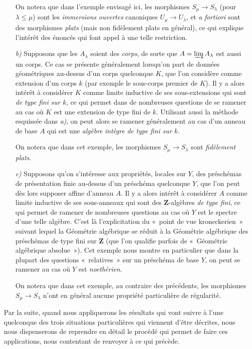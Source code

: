 \begin{env}[8.1.2]
\begin{enumerate}
On notera que dans l'exemple envisagé ici, les morphismes
$S_\mu\to S_\lambda$ (pour $\lambda\leq\mu$) sont les \emph{immersions
ouvertes} canoniques $U_\mu\to U_\lambda$, et \emph{a fortiori} sont des
morphismes \emph{plats} (mais non fidèlement plats en général), ce qui
explique l'intérêt des énoncés qui font appel à une telle restriction.

\item[\emph{b)}] Supposons que les $A_\lambda$ soient des \emph{corps}, de
sorte que $A=\varinjlim A_\lambda$ est aussi un corps. Ce cas se présente
généralement lorsqu'on part de données géométriques au-dessus d'un corps
quelconque $K$, que l'on considère comme extension d'un corps $k$ (par exemple
le sous-corps premier de $K$). Il y a alors intérêt à considérer $K$ comme
limite inductive de ses sous-extensions qui sont \emph{de type fini sur $k$},
ce qui permet dans de nombreuses questions de se ramener au cas où $K$ est
une extension de type fini de $k$. Utilisant aussi la méthode esquissée dans
\emph{a)}, on peut alors se ramener généralement au cas d'un anneau de base
$A$ qui est une \emph{algèbre intègre de type fini sur $k$}.

On notera que dans cet exemple, les morphismes $S_\mu\to S_\lambda$ sont
\emph{fidèlement plats}.

\item[\emph{c)}] Supposons qu'on s'intéresse aux propriétés, locales sur
$Y$, des préschémas de présentation finie au-dessus d'un préschéma quelconque
$Y$, que l'on peut dès lors supposer affine d'anneau $A$. Il y a alors intérêt
à considérer $A$ comme limite inductive de ses sous-anneaux qui sont des
$\mathbf Z$-algèbres \emph{de type fini}, ce qui permet de ramener de
nombreuses questions au cas où $Y$ est le spectre d'une telle algèbre. C'est
là l'explicitation du «~point de vue kroneckerien~» suivant lequel la
Géométrie algébrique se réduit à la Géométrie algébrique des préschémas de
type fini sur $\mathbf Z$ (que l'on qualifie parfois de
«~Géométrie algébrique absolue~»). Cet exemple nous montre en particulier que
dans la plupart des questions «~relatives~» sur un préschéma de base $Y$, on
peut se ramener au cas où $Y$ est \emph{noethérien}.

On notera que dans cet exemple, au contraire des précédents, les morphismes
$S_\mu\to S_\lambda$ n'ont en général aucune propriété particulière de
régularité.
\end{enumerate}

Par la suite, quand nous appliquerons les résultats qui vont suivre à l'une
quelconque des trois situations particulières qui viennent d'être décrites,
nous nous dispenserons de reprendre en détail le procédé qui permet de faire
ces applications, nous contentant de renvoyer à ce qui précède.
\end{env}

